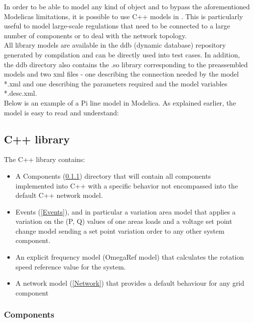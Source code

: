 \documentclass[a4paper, 12pt]{report}
\begin{document}
In order to be able to model any kind of object and to bypass the aforementioned Modelica\textquotesingle s limitations, it is possible to use C++ models in \Dynawo. This is particularly useful to model large-scale regulations that need to be connected to a large number of components or to deal with the network topology. \\

All library models are available in the ddb (dynamic database) repository generated by \Dynawo compilation and can be directly used into test cases. In addition, the ddb directory also contains the .so library corresponding to the preassembled models and two xml files - one describing the connection needed by the model *.xml and one describing the parameters required and the model variables *.desc.xml.  \\

Below is an example of a Pi line model in Modelica. As explained earlier, the model is easy to read and understand:



\subsection{C++ library}

The C++ library contains:
\begin{itemize}
\item A Components (\ref{Components}) directory that will contain all components implemented into C++ with a specific behavior not encompassed into the default C++ network model.
\item Events (\ref{Events}), and in particular a variation area model that applies a variation on the (P, Q) values of one area\textquotesingle s loads and a voltage set point change model sending a set point variation order to any other system component.
\item An explicit  frequency model (OmegaRef model) that calculates the rotation speed reference value for the system.
\item A network model (\ref{Network}) that provides a default behaviour for any grid component
\end{itemize}

\subsubsection{Components}
\label{Components}
\end{document}
